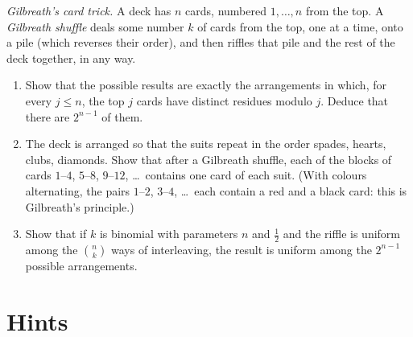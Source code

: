 \begin{exercise}[$\star\star$]\label{pb:gilbreath}
\emph{Gilbreath's card trick.} A deck has $n$ cards, numbered $1,\dots,n$ from the top. A \emph{Gilbreath shuffle} deals some number $k$ of cards from
the top, one at a time, onto a pile (which reverses their order), and then riffles that pile and the rest of the deck together, in
any way.
\begin{enumerate}[label=(\alph*)]
\item Show that the possible results are exactly the arrangements in which, for every $j\le n$, the top $j$ cards have distinct residues
modulo $j$. Deduce that there are $2^{n-1}$ of them.
\item The deck is arranged so that the suits repeat in the order spades, hearts, clubs, diamonds. Show that after a Gilbreath
shuffle, each of the blocks of cards $1$--$4$, $5$--$8$, $9$--$12$, \dots\ contains one card of each suit. (With colours alternating, the pairs
$1$--$2$, $3$--$4$, \dots\ each contain a red and a black card: this is Gilbreath's principle.)
\item Show that if $k$ is binomial with parameters $n$ and $\frac12$ and the riffle is uniform among the $\binom nk$ ways of interleaving, the result is
uniform among the $2^{n-1}$ possible arrangements.
\end{enumerate}
\end{exercise}

\section{Hints}

